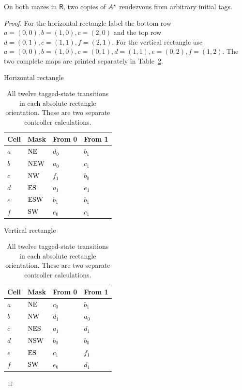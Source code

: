 \begin{lemma}\label{c:rectangles}
On both mazes in \(\mathsf R\), two copies of \(A^{\star}\) rendezvous from
arbitrary initial tags.
\end{lemma}
\begin{proof}
For the horizontal rectangle label the bottom row
\(a=(0,0),b=(1,0),c=(2,0)\) and the top row
\(d=(0,1),e=(1,1),f=(2,1)\).
For the vertical rectangle use
\(a=(0,0),b=(1,0),c=(0,1),d=(1,1),e=(0,2),f=(1,2)\).
The two complete maps are printed separately in
Table~\ref{c:rectangle-maps}.

\begin{table}[!htbp]
\centering\small
\begin{minipage}[t]{.48\textwidth}
\centering
Horizontal rectangle\par\smallskip
\begin{tabular}{llll}
\toprule
Cell & Mask & From 0 & From 1 \\
\midrule
\(a\)&\(\mathrm{N}\mathrm{E}\)&\(d_0\)&\(b_1\)\\
\(b\)&\(\mathrm{N}\mathrm{E}\mathrm{W}\)&\(a_0\)&\(c_1\)\\
\(c\)&\(\mathrm{N}\mathrm{W}\)&\(f_1\)&\(b_0\)\\
\(d\)&\(\mathrm{E}\mathrm{S}\)&\(a_1\)&\(e_1\)\\
\(e\)&\(\mathrm{E}\mathrm{S}\mathrm{W}\)&\(b_1\)&\(b_1\)\\
\(f\)&\(\mathrm{S}\mathrm{W}\)&\(e_0\)&\(c_1\)\\
\bottomrule
\end{tabular}
\end{minipage}\hfill
\begin{minipage}[t]{.48\textwidth}
\centering
Vertical rectangle\par\smallskip
\begin{tabular}{llll}
\toprule
Cell & Mask & From 0 & From 1 \\
\midrule
\(a\)&\(\mathrm{N}\mathrm{E}\)&\(c_0\)&\(b_1\)\\
\(b\)&\(\mathrm{N}\mathrm{W}\)&\(d_1\)&\(a_0\)\\
\(c\)&\(\mathrm{N}\mathrm{E}\mathrm{S}\)&\(a_1\)&\(d_1\)\\
\(d\)&\(\mathrm{N}\mathrm{S}\mathrm{W}\)&\(b_0\)&\(b_0\)\\
\(e\)&\(\mathrm{E}\mathrm{S}\)&\(c_1\)&\(f_1\)\\
\(f\)&\(\mathrm{S}\mathrm{W}\)&\(e_0\)&\(d_1\)\\
\bottomrule
\end{tabular}
\end{minipage}
\caption{All twelve tagged-state transitions in each absolute rectangle
orientation. These are two separate controller calculations.}
\label{c:rectangle-maps}
\end{table}


\end{proof}

